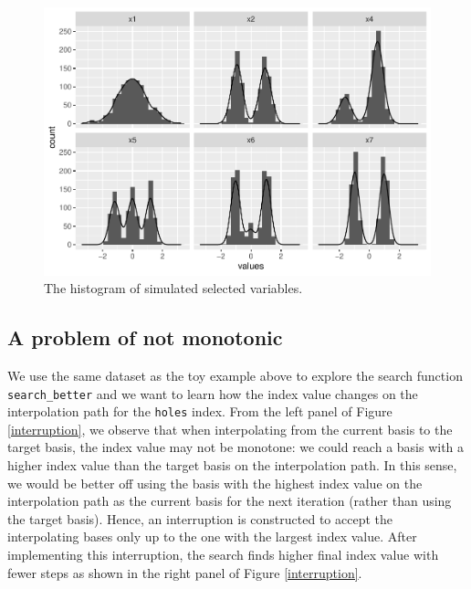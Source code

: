 \documentclass[12pt]{article}
\begin{document}
\begin{figure}
\centering
\includegraphics{paper_files/figure-latex/origin-data-1.pdf}
\caption{\label{origin-data} The histogram of simulated selected
variables.}
\end{figure}

\hypertarget{a-problem-of-not-monotonic}{%
\subsection{A problem of not
monotonic}\label{a-problem-of-not-monotonic}}

We use the same dataset as the toy example above to explore the search
function \texttt{search\_better} and we want to learn how the index
value changes on the interpolation path for the \texttt{holes} index.
From the left panel of Figure \ref{interruption}, we observe that when
interpolating from the current basis to the target basis, the index
value may not be monotone: we could reach a basis with a higher index
value than the target basis on the interpolation path. In this sense, we
would be better off using the basis with the highest index value on the
interpolation path as the current basis for the next iteration (rather
than using the target basis). Hence, an interruption is constructed to
accept the interpolating bases only up to the one with the largest index
value. After implementing this interruption, the search finds higher
final index value with fewer steps as shown in the right panel of Figure
\ref{interruption}.
\end{document}
